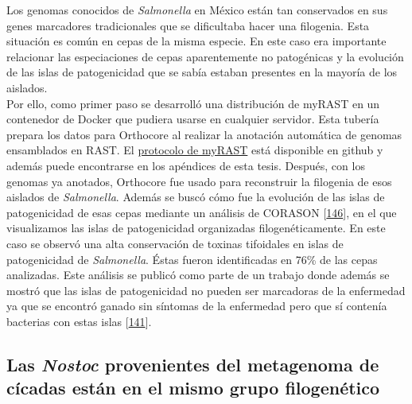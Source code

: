 \documentclass[12pt,twoside]{reedthesis}
\begin{document}
  Los genomas conocidos de \emph{Salmonella} en México están tan
  conservados en sus genes marcadores tradicionales que se dificultaba
  hacer una filogenia. Esta situación es común en cepas de la misma
  especie. En este caso era importante relacionar las especiaciones de
  cepas aparentemente no patogénicas y la evolución de las islas de
  patogenicidad que se sabía estaban presentes en la mayoría de los
  aislados.\\
  Por ello, como primer paso se desarrolló una distribución de myRAST en
  un contenedor de Docker que pudiera usarse en cualquier servidor. Esta
  tubería prepara los datos para Orthocore al realizar la anotación
  automática de genomas ensamblados en RAST. El
  \href{https://github.com/nselem/myrast}{protocolo de myRAST} está
  disponible en github y además puede encontrarse en los apéndices de esta
  tesis. Después, con los genomas ya anotados, Orthocore fue usado para
  reconstruir la filogenia de esos aislados de \emph{Salmonella}. Además
  se buscó cómo fue la evolución de las islas de patogenicidad de esas
  cepas mediante un análisis de CORASON
  {[}\protect\hyperlink{ref-navarro-munoz_computational_2018}{146}{]}, en
  el que visualizamos las islas de patogenicidad organizadas
  filogenéticamente. En este caso se observó una alta conservación de
  toxinas tifoidales en islas de patogenicidad de \emph{Salmonella}. Éstas
  fueron identificadas en 76\% de las cepas analizadas. Este análisis se
  publicó como parte de un trabajo donde además se mostró que las islas de
  patogenicidad no pueden ser marcadoras de la enfermedad ya que se
  encontró ganado sin síntomas de la enfermedad pero que sí contenía
  bacterias con estas islas
  {[}\protect\hyperlink{ref-delgado-suarez_whole_2018}{141}{]}.
  
  \subsection{\texorpdfstring{Las \emph{Nostoc} provenientes del
  metagenoma de cícadas están en el mismo grupo
  filogenético}{Las Nostoc provenientes del metagenoma de cícadas están en el mismo grupo filogenético}}\label{las-nostoc-provenientes-del-metagenoma-de-cicadas-estan-en-el-mismo-grupo-filogenetico}
  
\end{document}
